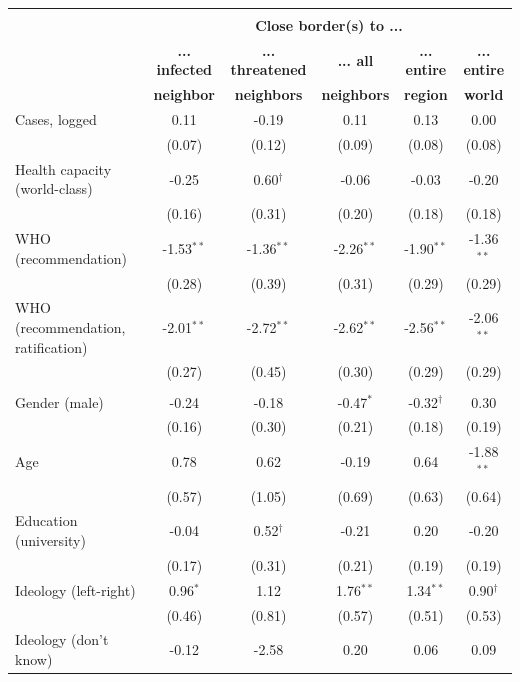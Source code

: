 \begin{table}[ht!]
\begin{center}
\footnotesize
\renewcommand{\arraystretch}{1.05}
\begin{tabular}{@{\extracolsep{4.8pt}}lccccc} 
\\[-1.8ex]\hline \\[-1.8ex]
 & \multicolumn{5}{c}{\normalsize{\textbf{Close border(s) to ...}}}
\\
  & \small{\textbf{... infected}} & \small{\textbf{... threatened}} & \small{\textbf{... all}} & \small{\textbf{... entire }} & \small{\textbf{... entire}}
 \\
  & \small{\textbf{neighbor}} & \small{\textbf{neighbors}} & \small{\textbf{neighbors}} & \small{\textbf{region}} & \small{\textbf{world}}
 \\
\hline
Cases, logged & 0.11 & -0.19 & 0.11 & 0.13 & 0.00\\
 & (0.07) & (0.12) & (0.09) & (0.08) & (0.08)\\
Health capacity (world-class) & -0.25 & 0.60$^{\dag}$ & -0.06 & -0.03 & -0.20\\
 & (0.16) & (0.31) & (0.20) & (0.18) & (0.18)\\
WHO (recommendation) & -1.53$^{**}$ & -1.36$^{**}$ & -2.26$^{**}$ & -1.90$^{**}$ & -1.36$^{**}$\\
 & (0.28) & (0.39) & (0.31) & (0.29) & (0.29)\\
WHO (recommendation, ratification) & -2.01$^{**}$ & -2.72$^{**}$ & -2.62$^{**}$ & -2.56$^{**}$ & -2.06$^{**}$\\
 & (0.27) & (0.45) & (0.30) & (0.29) & (0.29)\\
\\
Gender (male) & -0.24 & -0.18 & -0.47$^{*}$ & -0.32$^{\dag}$ & 0.30\\
 & (0.16) & (0.30) & (0.21) & (0.18) & (0.19)\\
Age & 0.78 & 0.62 & -0.19 & 0.64 & -1.88$^{**}$\\
 & (0.57) & (1.05) & (0.69) & (0.63) & (0.64)\\
Education (university) & -0.04 & 0.52$^{\dag}$ & -0.21 & 0.20 & -0.20\\
 & (0.17) & (0.31) & (0.21) & (0.19) & (0.19)\\
Ideology (left-right) & 0.96$^{*}$ & 1.12 & 1.76$^{**}$ & 1.34$^{**}$ & 0.90$^{\dag}$\\
 & (0.46) & (0.81) & (0.57) & (0.51) & (0.53)\\
Ideology (don't know) & -0.12 & -2.58 & 0.20 & 0.06 & 0.09\\

\end{tabular}
\end{center}
\end{table}
